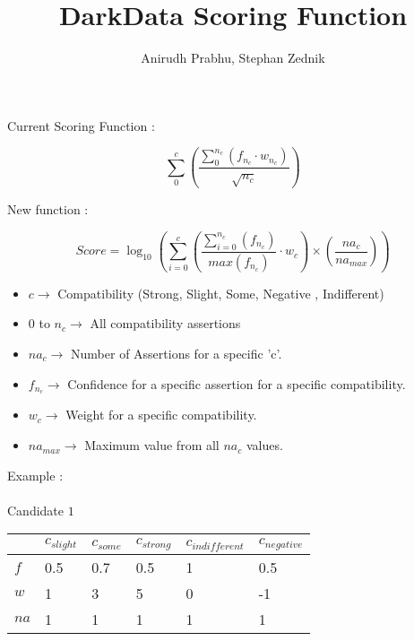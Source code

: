 \documentclass[11pt]{article}
\begin{document}
\title{DarkData Scoring Function}
\author{Anirudh Prabhu, Stephan Zednik}
\maketitle


\begin{large}

Current Scoring Function : 

$$ \sum^{c}_{0}\left(   \frac{\sum^{n_{c}}_{0} (f_{n_{c}} \cdot w_{n_{c}})}{\sqrt{n_{c}}} \right) $$

New function : 

$$ Score = \log_{10}  \left( \sum^{c}_{i=0}\left(  \frac{\sum^{n_{c}}_{i=0} \left( f_{n_{c}}   \right) }{max \left( f_{n_{c}}   \right)}  \cdot w_{c}  \right) \times \left( \frac{na_{c}}{na_{max}}\right)\right)   $$

\begin{itemize}

\item $c \longrightarrow $ Compatibility (Strong, Slight, Some, Negative , Indifferent)

\item $0$ to $n_{c} \longrightarrow $ All compatibility assertions

\item $na_{c} \longrightarrow $ Number of Assertions for a specific 'c'.

\item $f_{n_{c}} \longrightarrow $ Confidence for a specific assertion for a specific compatibility.

\item $w_{c} \longrightarrow $ Weight for a specific compatibility.

\item $na_{max} \longrightarrow $ Maximum value from all $na_{c}$ values.


\end{itemize}



Example : \\ \\
Candidate $1$ \\
\begin{tabular}{|l|l|l|l|l|l|}
\hline
  & $c_{slight}$  & $c_{some}$  & $c_{strong}$  & $c_{indifferent}$ & $c_{negative}$  \\ \hline
$f$ & 0.5 & 0.7 & 0.5 & 1  & 0.5 \\ \hline
$w$ & 1   & 3   & 5   & 0  & -1  \\ \hline
$na$ & 1  & 1  & 1  & 1 & 1  \\ \hline
\end{tabular} 


\end{large}
\end{document}
